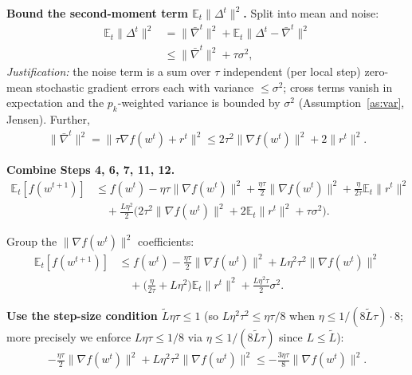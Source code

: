 \documentclass{article}
\begin{document}
\textbf{Bound the second-moment term $\mathbb{E}_t\|\Delta^t\|^2$.} Split into mean and noise:
\begin{align}
\mathbb{E}_t\|\Delta^t\|^2
&= \|\bar\nabla^t\|^2 + \mathbb{E}_t\|\Delta^t - \bar\nabla^t\|^2 \nonumber\\
&\le \|\bar\nabla^t\|^2 + \tau\sigma^2,
\tag{Step 11}
\end{align}
\emph{Justification:} the noise term is a sum over $\tau$ independent (per local step) zero-mean stochastic gradient errors each with variance $\le\sigma^2$; cross terms vanish in expectation and the $p_k$-weighted variance is bounded by $\sigma^2$ (Assumption~\ref{as:var}, Jensen).
Further,
\begin{align}
\|\bar\nabla^t\|^2 = \|\tau\nabla f(w^t)+r^t\|^2 \le 2\tau^2\|\nabla f(w^t)\|^2 + 2\|r^t\|^2 .
\tag{Step 12}
\end{align}

\textbf{Combine Steps 4, 6, 7, 11, 12.}
\begin{align}
\mathbb{E}_t[f(w^{t+1})]
&\le f(w^t) - \eta\tau\|\nabla f(w^t)\|^2
 + \frac{\eta\tau}{2}\|\nabla f(w^t)\|^2 + \frac{\eta}{2\tau}\mathbb{E}_t\|r^t\|^2 \nonumber\\
&\quad + \frac{L\eta^2}{2}\Big(2\tau^2\|\nabla f(w^t)\|^2 + 2\mathbb{E}_t\|r^t\|^2 + \tau\sigma^2\Big).
\tag{Step 13}
\end{align}

Group the $\|\nabla f(w^t)\|^2$ coefficients:
\begin{align}
\mathbb{E}_t[f(w^{t+1})]
&\le f(w^t) - \frac{\eta\tau}{2}\|\nabla f(w^t)\|^2 + L\eta^2\tau^2\|\nabla f(w^t)\|^2 \nonumber\\
&\quad + \Big(\frac{\eta}{2\tau} + L\eta^2\Big)\mathbb{E}_t\|r^t\|^2
 + \frac{L\eta^2\tau}{2}\sigma^2 .
\tag{Step 14}
\end{align}

\textbf{Use the step-size condition $\tilde L\eta\tau \le 1$} (so $L\eta^2\tau^2 \le \eta\tau/8$ when $\eta \le 1/(8\tilde L\tau)\cdot 8$; more precisely we enforce $L\eta\tau \le 1/8$ via $\eta\le 1/(8\tilde L\tau)$ since $L\le\tilde L$):
\begin{align}
- \frac{\eta\tau}{2}\|\nabla f(w^t)\|^2 + L\eta^2\tau^2\|\nabla f(w^t)\|^2
\le -\frac{3\eta\tau}{8}\|\nabla f(w^t)\|^2 .
\tag{Step 15}
\end{align}
\end{document}

